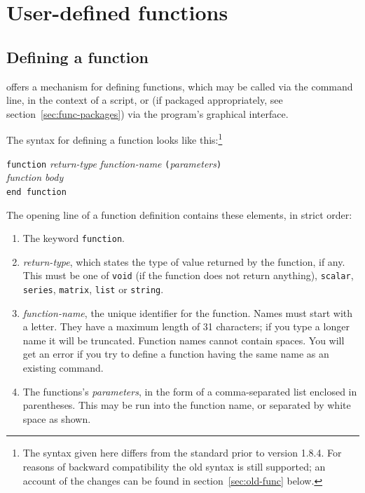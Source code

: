 \chapter{User-defined functions}
\label{chap:functions}

\section{Defining a function}
\label{func-define}

 offers a mechanism for defining functions, which may be
called via the command line, in the context of a script, or (if
packaged appropriately, see section~\ref{sec:func-packages}) via the
program's graphical interface.

The syntax for defining a function looks like this:\footnote{The
  syntax given here differs from the standard prior to 
  version 1.8.4.  For reasons of backward compatibility the old syntax
  is still supported; an account of the changes can be found in
  section~\ref{sec:old-func} below.}

\begin{raggedright}
\texttt{function} \textsl{return-type} \textsl{function-name}
\texttt{(}\textsl{parameters}\texttt{)} \\
\qquad  \textsl{function body} \\
\texttt{end function}
\end{raggedright}

The opening line of a function definition contains these elements, in
strict order:

\begin{enumerate}
\item The keyword \texttt{function}.
\item \textsl{return-type}, which states the type of value returned by
  the function, if any.  This must be one of \texttt{void} (if the
  function does not return anything), \texttt{scalar},
  \texttt{series}, \texttt{matrix}, \texttt{list} or \texttt{string}.
\item \textsl{function-name}, the unique identifier for the
  function.  Names must start with a letter. They have a maximum
  length of 31 characters; if you type a longer name it will be
  truncated.  Function names cannot contain spaces.  You will get an
  error if you try to define a function having the same name as an
  existing  command.
\item The functions's \textsl{parameters}, in the form of a
  comma-separated list enclosed in parentheses.  This may be run
  into the function name, or separated by white space as shown.
\end{enumerate}

